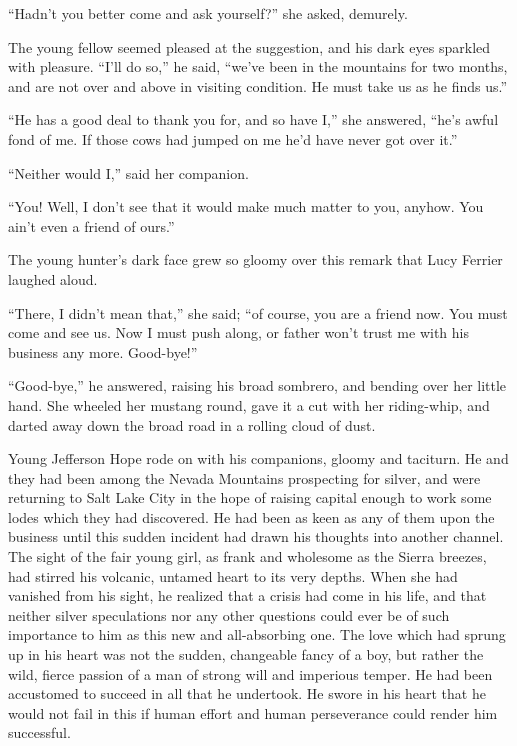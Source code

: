 \documentclass[12pt]{book}
\begin{document}
“Hadn’t you better come and ask yourself?” she asked, demurely. 

The young fellow seemed pleased at the suggestion, and his dark eyes sparkled with pleasure. “I’ll do so,” he said, “we’ve been in the mountains for two months, and are not over and above in visiting condition. He must take us as he finds us.” 

“He has a good deal to thank you for, and so have I,” she answered, “he’s awful fond of me. If those cows had jumped on me he’d have never got over it.” 

“Neither would I,” said her companion. 

“You! Well, I don’t see that it would make much matter to you, anyhow. You ain’t even a friend of ours.” 

The young hunter’s dark face grew so gloomy over this remark that Lucy Ferrier laughed aloud. 

“There, I didn’t mean that,” she said; “of course, you are a friend now. You must come and see us. Now I must push along, or father won’t trust me with his business any more. Good-bye!” 

“Good-bye,” he answered, raising his broad sombrero, and bending over her little hand. She wheeled her mustang round, gave it a cut with her riding-whip, and darted away down the broad road in a rolling cloud of dust. 

Young Jefferson Hope rode on with his companions, gloomy and taciturn. He and they had been among the Nevada Mountains prospecting for silver, and were returning to Salt Lake City in the hope of raising capital enough to work some lodes which they had discovered. He had been as keen as any of them upon the business until this sudden incident had drawn his thoughts into another channel. The sight of the fair young girl, as frank and wholesome as the Sierra breezes, had stirred his volcanic, untamed heart to its very depths. When she had vanished from his sight, he realized that a crisis had come in his life, and that neither silver speculations nor any other questions could ever be of such importance to him as this new and all-absorbing one. The love which had sprung up in his heart was not the sudden, changeable fancy of a boy, but rather the wild, fierce passion of a man of strong will and imperious temper. He had been accustomed to succeed in all that he undertook. He swore in his heart that he would not fail in this if human effort and human perseverance could render him successful. 
\end{document}
